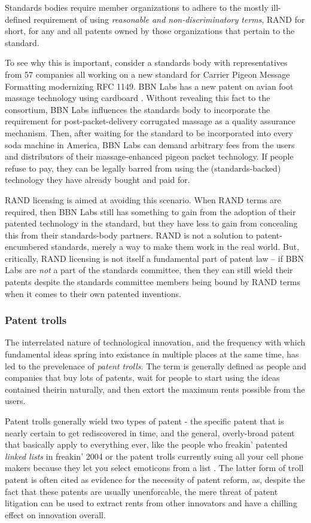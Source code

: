 \documentclass[acmtocl]%
{boviktrans}
\begin{document}
Standards bodies require member organizations to adhere to the mostly
ill-defined requirement of using {\it reasonable and
  non-discriminatory terms}, RAND for short, for any and all patents
owned by those organizations that pertain to the standard.

To see why this is important, consider a standards body with
representatives from 57 companies all working on a new standard for
Carrier Pigeon Message Formatting modernizing RFC 1149. BBN Labs has a
new patent on avian foot massage technology using cardboard
\cite{ebert}. Without revealing this fact to the consortium, BBN Labs
influences the standards body to incorporate the requirement for
post-packet-delivery corrugated massage as a quality assurance
mechanism. Then, after waiting for the standard to be incorporated
into every soda machine in America, BBN Labs can demand arbitrary fees
from the users and distributors of their massage-enhanced pigeon
packet technology. If people refuse to pay, they can be legally barred
from using the (standards-backed) technology they have already bought
and paid for.

RAND licensing is aimed at avoiding this scenario. When
RAND terms are required, then BBN Labs still has something to gain
from the adoption of their patented technology in the standard, but
they have less to gain from concealing this from their standards-body
partners. RAND is not a solution to patent-encumbered standards,
merely a way to make them work in the real world. But, critically,
RAND licensing is not itself a fundamental part of patent law -- if
BBN Labs are {\it not} a part of the standards committee, then they can
still wield their patents despite the standards committee members
being bound by RAND terms when it comes to their own patented
inventions. 

\subsubsection{Patent trolls}

The interrelated nature of technological innovation, and the frequency
with which fundamental ideas spring into existance in multiple places
at the same time, has led to the prevelenace of {\it patent trolls}.
The term is generally defined as people and companies that buy lots of
patents, wait for people to start using the ideas contained theirin
naturally, and then extort the maximum rents possible from the users.

Patent trolls generally wield two types of patent - the specific
patent that is nearly certain to get rediscovered in time, and the
general, overly-broad patent that basically apply to everything ever,
like the people who freakin' patented {\it linked lists} in freakin'
2004 \cite{want} or the patent trolls currently suing all your cell
phone makers because they let you select emoticons from a list
\cite{smile}.  The latter form of troll patent is often cited as
evidence for the necessity of patent reform, as, despite the fact that
these patents are usually unenforcable, the mere threat of patent
litigation can be used to extract rents from other innovators and have
a chilling effect on innovation overall.
\end{document}
